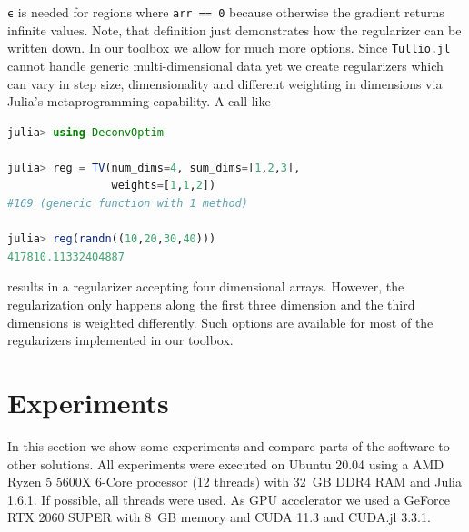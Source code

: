 \documentclass{juliacon}
\begin{document}
        \lstinline{ϵ} is needed for regions where \lstinline{arr == 0} because otherwise the gradient returns infinite values.
        Note, that definition just demonstrates how the regularizer can be written down.
        In our toolbox we allow for much more options. Since \verb|Tullio.jl| cannot handle generic multi-dimensional data yet
        we create regularizers which can vary in step size, dimensionality and
        different weighting in dimensions via Julia's metaprogramming capability.
        A call like 
        \begin{lstlisting}[language = Julia]
julia> using DeconvOptim

julia> reg = TV(num_dims=4, sum_dims=[1,2,3],
                weights=[1,1,2])
#169 (generic function with 1 method)

julia> reg(randn((10,20,30,40)))
417810.11332404887
        \end{lstlisting}
        results in a regularizer accepting four dimensional arrays. However, the regularization only happens along the first three dimension
        and the third dimensions is weighted differently.
        Such options are available for most of the regularizers implemented in our toolbox.

\section{Experiments}
    In this section we show some experiments and compare parts of the software to other solutions.
    All experiments were executed on Ubuntu 20.04 using a AMD Ryzen 5 5600X 6-Core processor (12 threads) with \SI{32}{GB} DDR4 RAM and Julia 1.6.1.
    If possible, all threads were used.
    As GPU accelerator we used a GeForce RTX 2060 SUPER with \SI{8}{GB} memory and CUDA 11.3 and CUDA.jl 3.3.1.
\end{document}
